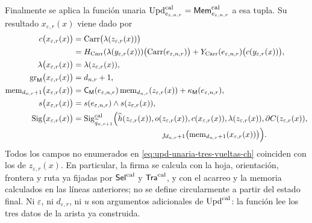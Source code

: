 Finalmente se aplica la función unaria
\(\operatorname{Upd}^{\rm cal}_{e_{\varepsilon,n,r}}
=\mathsf{Mem}^{\rm cal}_{e_{\varepsilon,n,r}}\) a esa tupla. Su
resultado \(x_{\varepsilon,r}(x)\) viene dado por
\begin{equation}
\begin{aligned}
 c\bigl(x_{\varepsilon,r}(x)\bigr)
   &=\operatorname{Carr}\bigl(\lambda(z_{\varepsilon,r}(x))\bigr)\\
   &=H_{\rm Carr}(\lambda(y_{\varepsilon,r}(x)))
       \bigl(\operatorname{Carr}(e_{\varepsilon,n,r})\bigr)
     +Y_{\rm Carr}(e_{\varepsilon,n,r})
       \bigl(c(y_{\varepsilon,r}(x))\bigr),\\
 \lambda\bigl(x_{\varepsilon,r}(x)\bigr)
   &=\lambda(z_{\varepsilon,r}(x)),\\
 \operatorname{gr}_{\mathsf M}
      \bigl(x_{\varepsilon,r}(x)\bigr)
   &=d_{n,r}+1,\\
 \operatorname{mem}_{d_{n,r}+1}
       \bigl(x_{\varepsilon,r}(x)\bigr)
   &=\mathsf C_{\mathsf M}(e_{\varepsilon,n,r})
       \operatorname{mem}_{d_{n,r}}(z_{\varepsilon,r}(x))
     +\kappa_{\mathsf M}(e_{\varepsilon,n,r}),\\
 s\bigl(x_{\varepsilon,r}(x)\bigr)
   &=s(e_{\varepsilon,n,r})\wedge s(z_{\varepsilon,r}(x)),\\
 \operatorname{Sig}\bigl(x_{\varepsilon,r}(x)\bigr)
   &=\operatorname{Sig}^{\rm cal}_{\widetilde q_{n,r+1}}
       \Bigl(\widehat h(z_{\varepsilon,r}(x)),
             o(z_{\varepsilon,r}(x)),
             c(x_{\varepsilon,r}(x)),
             \lambda(z_{\varepsilon,r}(x)),
             \partial C(z_{\varepsilon,r}(x)),\\[-2pt]
   &\hspace{112pt}
             \jmath_{d_{n,r}+1}
              \bigl(\operatorname{mem}_{d_{n,r}+1}
                 (x_{\varepsilon,r}(x))\bigr)\Bigr).
\end{aligned}
\label{eq:upd-unaria-tres-vueltas-ch}
\end{equation}
Todos los campos no enumerados en
\eqref{eq:upd-unaria-tres-vueltas-ch} coinciden con los de
\(z_{\varepsilon,r}(x)\). En particular, la firma se calcula con la hoja,
orientación, frontera y ruta ya fijadas por \(\mathsf{Sel}^{\rm cal}\) y
\(\mathsf{Tra}^{\rm cal}\), y con el acarreo y la memoria calculados en las
líneas anteriores; no se define circularmente a partir del estado final.
Ni \(\varepsilon\), ni \(d_{\varepsilon,r}\), ni \(u\) son argumentos
adicionales de \(\operatorname{Upd}^{\rm cal}\): la función lee los tres datos de la
arista ya construida.

